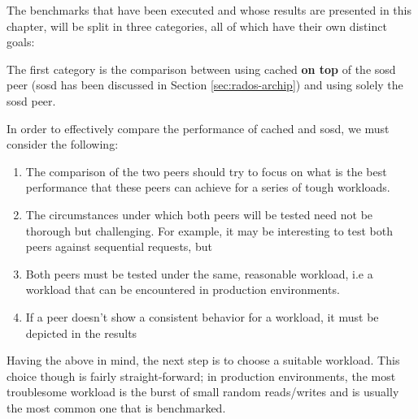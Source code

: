 The benchmarks that have been executed and whose results are presented in this 
chapter, will be split in three categories, all of which have their own 
distinct goals:

The first category is the comparison between using cached \textbf{on top} of 
the sosd peer (sosd has been discussed in Section \ref{sec:rados-archip}) and 
using solely the sosd peer.

\begin{comment}
The category's goal is to "defend" one of the core thesis arguments, that 
tiering is a key element that will improve the performance of Archipelago.  
\end{comment}

In order to effectively compare the performance of cached and sosd, we must 
consider the following: 

\begin{enumerate}
	\item The comparison of the two peers should try to focus on what is 
		the best performance that these peers can achieve for a series 
		of tough workloads.
	\item The circumstances under which both peers will be tested need not 
		be thorough but challenging. For example, it may be interesting 
		to test both peers against sequential requests, but
	\item Both peers must be tested under the same, reasonable workload, i.e a 
		workload that can be encountered in production environments.
	\item If a peer doesn't show a consistent behavior for a workload, it must 
		be depicted in the results
\end{enumerate}

Having the above in mind, the next step is to choose a suitable workload.  This 
choice though is fairly straight-forward; in production environments, the most 
troublesome workload is the burst of small random reads/writes and is usually 
the most common one that is benchmarked.  

